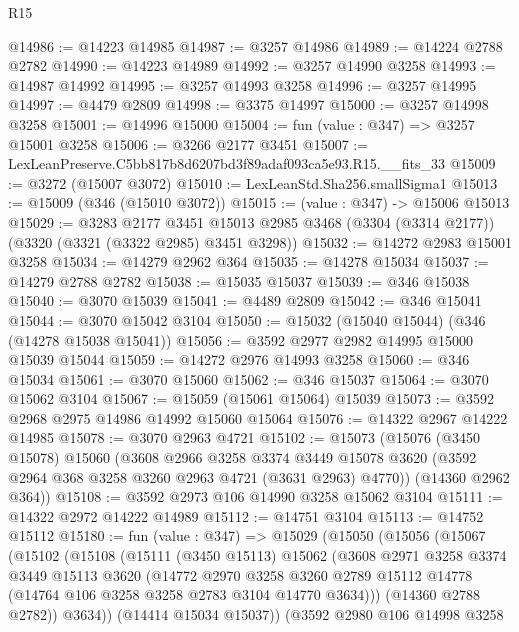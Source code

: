 \begin{lexlean}{R15}
\begin{coremodule}
@14986 := @14223 @14985
@14987 := @3257 @14986
@14989 := @14224 @2788 @2782
@14990 := @14223 @14989
@14992 := @3257 @14990 @3258
@14993 := @14987 @14992
@14995 := @3257 @14993 @3258
@14996 := @3257 @14995
@14997 := @4479 @2809
@14998 := @3375 @14997
@15000 := @3257 @14998 @3258
@15001 := @14996 @15000
@15004 := fun (value : @347) => @3257 @15001 @3258
@15006 := @3266 @2177 @3451
@15007 := LexLeanPreserve.C5bb817b8d6207bd3f89adaf093ca5e93.R15.__fits_33
@15009 := @3272 (@15007 @3072)
@15010 := LexLeanStd.Sha256.smallSigma1
@15013 := @15009 (@346 (@15010 @3072))
@15015 := (value : @347) -> @15006 @15013
@15029 := @3283
    @2177
    @3451
    @15013
    @2985
    @3468
    (@3304 (@3314 @2177))
    (@3320 (@3321 (@3322 @2985) @3451 @3298))
@15032 := @14272 @2983 @15001 @3258
@15034 := @14279 @2962 @364
@15035 := @14278 @15034
@15037 := @14279 @2788 @2782
@15038 := @15035 @15037
@15039 := @346 @15038
@15040 := @3070 @15039
@15041 := @4489 @2809
@15042 := @346 @15041
@15044 := @3070 @15042 @3104
@15050 := @15032 (@15040 @15044) (@346 (@14278 @15038 @15041))
@15056 := @3592 @2977 @2982 @14995 @15000 @15039 @15044
@15059 := @14272 @2976 @14993 @3258
@15060 := @346 @15034
@15061 := @3070 @15060
@15062 := @346 @15037
@15064 := @3070 @15062 @3104
@15067 := @15059 (@15061 @15064) @15039
@15073 := @3592 @2968 @2975 @14986 @14992 @15060 @15064
@15076 := @14322 @2967 @14222 @14985
@15078 := @3070 @2963 @4721
@15102 := @15073
    (@15076
      (@3450 @15078)
      @15060
      (@3608
        @2966
        @3258
        @3374
        @3449
        @15078
        @3620
        (@3592 @2964 @368 @3258 @3260 @2963 @4721 (@3631 @2963) @4770))
      (@14360 @2962 @364))
@15108 := @3592 @2973 @106 @14990 @3258 @15062 @3104
@15111 := @14322 @2972 @14222 @14989
@15112 := @14751 @3104
@15113 := @14752 @15112
@15180 := fun (value : @347) =>
  @15029
    (@15050
      (@15056
        (@15067
          (@15102
            (@15108
              (@15111
                (@3450 @15113)
                @15062
                (@3608
                  @2971
                  @3258
                  @3374
                  @3449
                  @15113
                  @3620
                  (@14772
                    @2970
                    @3258
                    @3260
                    @2789
                    @15112
                    @14778
                    (@14764 @106 @3258 @3258 @2783 @3104 @14770 @3634)))
                (@14360 @2788 @2782))
              @3634))
          (@14414 @15034 @15037))
        (@3592
          @2980
          @106
          @14998
          @3258

\end{coremodule}
\end{lexlean}
